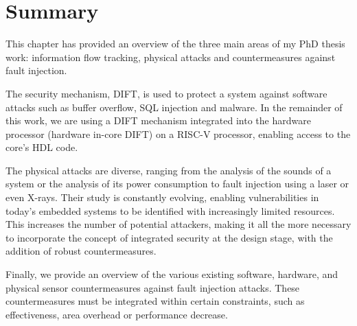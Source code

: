 \section{Summary}
This chapter has provided an overview of the three main areas of my PhD thesis work: information flow tracking, physical attacks and countermeasures against fault injection.

The security mechanism, DIFT, is used to protect a system against software attacks such as buffer overflow, SQL injection and malware. In the remainder of this work, we are using a DIFT mechanism integrated into the hardware processor (hardware in-core DIFT) on a RISC-V processor, enabling access to the core's HDL code.

The physical attacks are diverse, ranging from the analysis of the sounds of a system or the analysis of its power consumption to fault injection using a laser or even X-rays. Their study is constantly evolving, enabling vulnerabilities in today's embedded systems to be identified with increasingly limited resources. This increases the number of potential attackers, making it all the more necessary to incorporate the concept of integrated security at the design stage, with the addition of robust countermeasures.

Finally, we provide an overview of the various existing software, hardware, and physical sensor countermeasures against fault injection attacks. These countermeasures must be integrated within certain constraints, such as effectiveness, area overhead or performance decrease.

